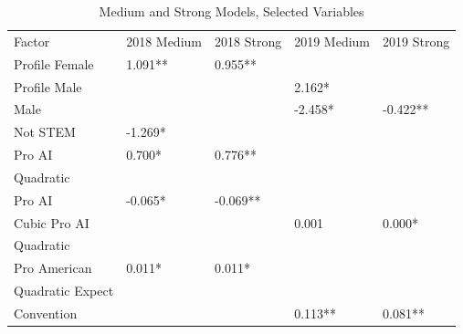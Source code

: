 \documentclass[AER]{./aea-latex-templates/AEA}
\begin{document}
\begin{table}
    \caption{Medium and Strong Models, Selected Variables}
    \begin{tabular}{lllll}
    Factor & 2018 Medium & 2018 Strong & 2019 Medium & 2019 Strong \\
    Profile Female & 1.091** & 0.955** \\ %
    Profile Male &  &  & 2.162* &  \\ %
    Male &  &  & -2.458* & -0.422** \\
    Not STEM & -1.269* \\ %
    Pro AI & 0.700* & 0.776** \\ %
    Quadratic
    \\Pro AI & -0.065* & -0.069** \\ %
    Cubic Pro AI &  &  & 0.001 & 0.000* \\ %
    Quadratic
    \\Pro American & 0.011* & 0.011* \\ %
    Quadratic Expect
    \\Convention &  &  & 0.113** & 0.081** \\ %

\end{tabular}
\end{table}
\end{document}
